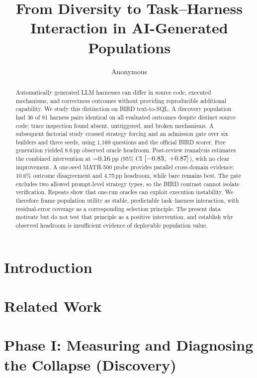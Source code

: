 \documentclass{article}
\title{From Diversity to Task--Harness Interaction in AI-Generated Populations}
\author{Anonymous}
\begin{document}
\maketitle

\begin{abstract}
Automatically generated LLM harnesses can differ in source code, executed
mechanisms, and correctness outcomes without providing reproducible additional
capability. We study this distinction on BIRD text-to-SQL. A discovery
population had 36 of 91 harness pairs identical on all evaluated outcomes
despite distinct source code; trace inspection found absent, untriggered, and
broken mechanisms. A subsequent factorial study crossed strategy forcing and
an admission gate over six builders and three seeds, using 1{,}169 questions
and the official BIRD scorer. Free generation yielded 8.6\,pp observed oracle
headroom. Post-review reanalysis estimates the combined intervention at
$-0.16$\,pp (95\% CI $[-0.83,\ +0.87]$), with no clear
improvement. A one-seed MATH-500 probe provides parallel cross-domain evidence:
10.6\% outcome disagreement and 4.75\,pp headroom, while bare remains best.
The gate excludes two allowed prompt-level strategy types, so the BIRD contrast
cannot isolate verification. Repeats show that one-run oracles can exploit
execution instability. We therefore frame population utility as stable,
predictable task--harness interaction, with residual-error coverage as a
corresponding selection principle. The present data motivate but do not test
that principle as a positive intervention, and establish why observed headroom
is insufficient evidence of deployable population value.
\end{abstract}

\section{Introduction}\label{sec:introduction}


\section{Related Work}\label{sec:related}


\section{Phase I: Measuring and Diagnosing the Collapse (Discovery)}\label{sec:phase1}

\end{document}
